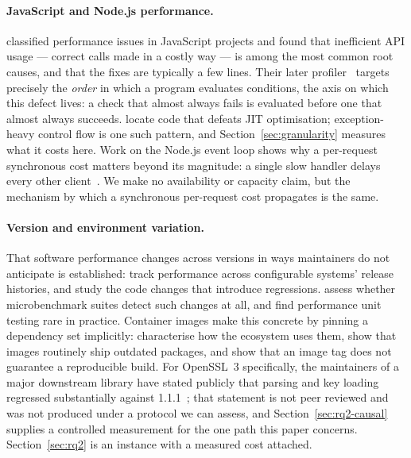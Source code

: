 \documentclass[pdflatex,sn-basic,twocolumn]{sn-jnl}%
\begin{document}
\paragraph{JavaScript and Node.js performance.} \citet{selakovic2016performance} classified performance issues in
JavaScript projects and found that inefficient API usage --- correct calls made
in a costly way --- is among the most common root causes, and that the fixes
are typically a few lines. Their later profiler~\citep{selakovic2017actionable}
targets precisely the \emph{order} in which a program evaluates conditions, the
axis on which this defect lives: a check that almost always fails is evaluated
before one that almost always succeeds. \citet{gong2015jitprof}
locate code that defeats JIT optimisation; exception-heavy control flow is one
such pattern, and Section~\ref{sec:granularity} measures what it costs here.
Work on the Node.js event loop shows why a per-request synchronous cost matters
beyond its magnitude: a single slow handler delays every other
client~\citep{davis2018sense,staicu2018freezing}. We make no availability or
capacity claim, but the mechanism by which a synchronous per-request cost
propagates is the same.

\paragraph{Version and environment variation.} That software performance
changes across versions in ways maintainers do not anticipate is established:
\citet{kaltenecker2023performance} track performance across
configurable systems' release histories, and \citet{chen2017exploratory} study the code changes that introduce
regressions. \citet{laaber2018evaluation} assess whether
microbenchmark suites detect such changes at all, and \citet{stefan2017unit} find performance unit testing rare in practice.
Container images make this concrete by pinning a dependency set implicitly:
\citet{cito2017empirical} characterise how the ecosystem uses them,
\citet{zerouali2019outdated} show that images routinely ship
outdated packages, and \citet{malka2026docker} show that an image
tag does not guarantee a reproducible build. For OpenSSL~3 specifically, the
maintainers of a major downstream library have stated publicly that parsing and
key loading regressed substantially against 1.1.1~\citep{pyca2026stateofopenssl};
that statement is not peer reviewed and was not produced under a protocol we
can assess, and Section~\ref{sec:rq2-causal} supplies a controlled measurement
for the one path this paper concerns. Section~\ref{sec:rq2} is an instance with
a measured cost attached.
\end{document}
